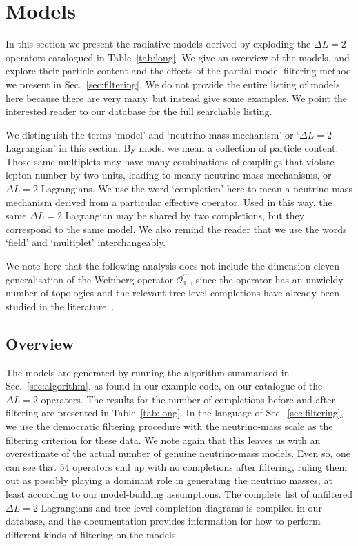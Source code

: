 \section{Models}
\label{sec:models}

In this section we present the radiative models derived by exploding the
$\Delta L = 2$ operators catalogued in Table~\ref{tab:long}. We give an overview
of the models, and explore their particle content and the effects of the partial
model-filtering method we present in Sec.~\ref{sec:filtering}. We do not provide
the entire listing of models here because there are very many, but instead give
some examples. We point the interested reader to our database for the full
searchable listing.

We distinguish the terms `model' and `neutrino-mass mechanism' or
`$\Delta L = 2$ Lagrangian' in this section. By model we mean a collection of
particle content. Those same multiplets may have many combinations of couplings
that violate lepton-number by two units, leading to meany neutrino-mass
mechanisms, or $\Delta L = 2$ Lagrangians. We use the word `completion' here to
mean a neutrino-mass mechanism derived from a particular effective operator.
Used in this way, the same $\Delta L = 2$ Lagrangian may be shared by two
completions, but they correspond to the same model. We also remind the reader
that we use the words `field' and `multiplet' interchangeably.

We note here that the following analysis does not include the dimension-eleven
generalisation of the Weinberg operator $\mathcal{O}_{1}^{\prime\prime\prime}$,
since the operator has an unwieldy number of topologies and the relevant
tree-level completions have already been studied in the
literature~\cite{Anamiati:2018cuq}.

\subsection{Overview}
\label{sec:modelsoverview}

The models are generated by running the algorithm summarised in
Sec.~\ref{sec:algorithm}, as found in our example code, on our catalogue of the
$\Delta L = 2$ operators. The results for the number of completions before and
after filtering are presented in Table~\ref{tab:long}. In the language of
Sec.~\ref{sec:filtering}, we use the democratic filtering procedure with the
neutrino-mass scale as the filtering criterion for these data. We note again
that this leaves us with an overestimate of the actual number of genuine
neutrino-mass models. Even so, one can see that 54 operators end up with no
completions after filtering, ruling them out as possibly playing a dominant role
in generating the neutrino masses, at least according to our model-building
assumptions. The complete list of unfiltered $\Delta L = 2$ Lagrangians and
tree-level completion diagrams is compiled in our database, and the
documentation provides information for how to perform different kinds of
filtering on the models.

